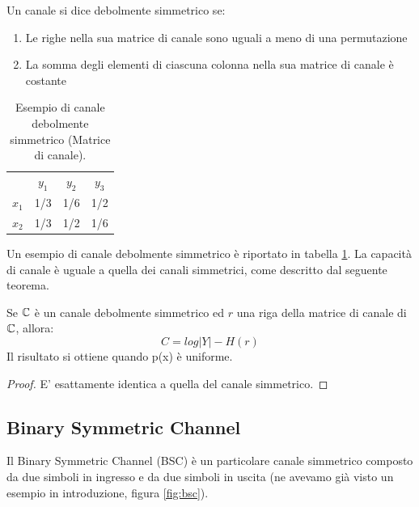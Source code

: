\medskip

\begin{definizione}
 Un canale si dice debolmente simmetrico se:
 \begin{enumerate}
  \item Le righe nella sua matrice di canale sono uguali a meno di una permutazione
  \item La somma degli elementi di ciascuna colonna nella sua matrice di canale è costante
 \end{enumerate}
\end{definizione}

\begin{table}[htbp]
  \begin{center}
   \begin{tabular}{c c c c}
	  & $y_1$ & $y_2$ & $y_3$ \\
	$x_1$ & 1/3 & 1/6 & 1/2 \\ 
	$x_2$ & 1/3 & 1/2 & 1/6  \\ 
    \end{tabular}
  \end{center}
  \label{tdsim}
  \caption{Esempio di canale debolmente simmetrico (Matrice di canale).}
\end{table}

\noindent
Un esempio di canale debolmente simmetrico è riportato in tabella \ref{tdsim}.
La capacità di canale è uguale a quella dei canali simmetrici, come descritto dal seguente teorema.

\begin{teorema}
 Se $\mathbb{C}$ è un canale debolmente simmetrico ed $r$ una riga della matrice di canale di $\mathbb{C}$, allora:
 \[
  C=log|Y| - H(r)
 \]
 Il risultato si ottiene quando p(x) è uniforme.
\begin{proof}
 E' esattamente identica a quella del canale simmetrico.
\end{proof}

\end{teorema}

\subsection{Binary Symmetric Channel}

Il Binary Symmetric Channel (BSC) è un particolare canale simmetrico composto da due simboli in ingresso e da due simboli in uscita (ne avevamo già visto un esempio in introduzione, figura \ref{fig:bsc}).

